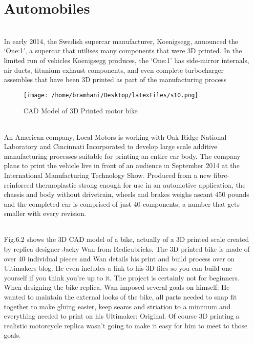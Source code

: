 \documentclass[12pt,a4paper]{report}
\begin{document}
	\section{Automobiles}
	
	\indent
	\\In early 2014, the Swedish supercar manufacturer, Koenigsegg, announced the ‘One:1’, a
	supercar that utilises many components that were 3D printed. In the limited run of vehicles
	Koenigsegg produces, the ‘One:1’ has side-mirror internals, air ducts, titanium exhaust components,
	and even complete turbocharger assembles that have been 3D printed as part of the manufacturing
	process\par
		\begin{figure}[H]
		\centering
		\texttt{[image: /home/bramhani/Desktop/latexFiles/s10.png]}
		\label{fig:CAD Model of 3D Printed motor bike}
		\caption{CAD Model of 3D Printed motor bike}
	\end{figure}
	\indent
	\\An American company, Local Motors is working with Oak Ridge National Laboratory and
	Cincinnati Incorporated to develop large scale additive manufacturing processes suitable for
	printing an entire car body. The company plans to print the vehicle live in front of an audience in
	September 2014 at the International Manufacturing Technology Show. Produced from a new fibre-
	reinforced thermoplastic strong enough for use in an automotive application, the chassis and body
	without drivetrain, wheels and brakes weighs ascant 450 pounds and the completed car is comprised
	of just 40 components, a number that gets smaller with every revision.\par
	

	\indent
	\\Fig.6.2 shows the 3D CAD model of a bike, actually of a 3D printed scale created by replica
	designer Jacky Wan from Redicubricks. The 3D printed bike is made of over 40 individual pieces
	and Wan details his print and build process over on Ultimakers blog. He even includes a link to his
	3D files so you can build one yourself if you think you’re up to it. The project is certainly not for
	beginners. When designing the bike replica, Wan imposed several goals on himself; He wanted to
	maintain the external looks of the bike, all parts needed to snap fit together to make gluing easier,
	keep seams and striation to a minimum and everything needed to print on his Ultimaker: Original.
	Of course 3D printing a realistic motorcycle replica wasn’t going to make it easy for him to meet to
	those goals.\par
\end{document}

